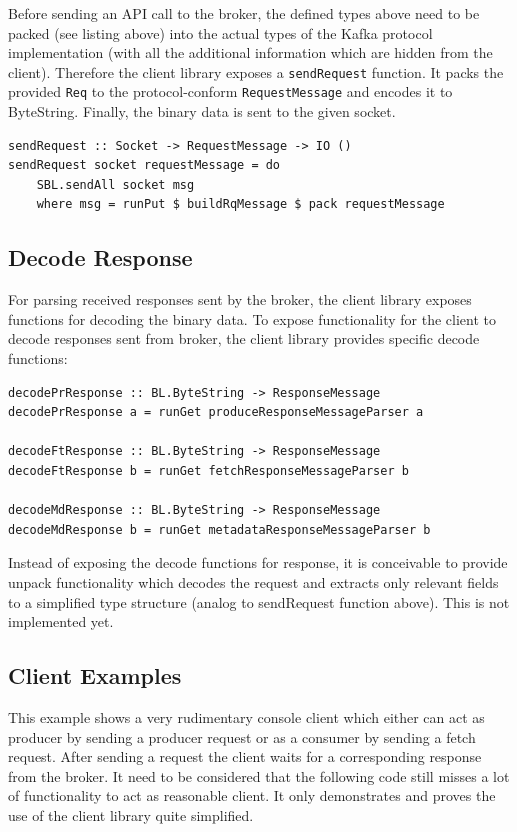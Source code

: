 Before sending an API call to the broker, the defined types above need to be
packed (see listing above) into the actual types of the Kafka protocol
implementation (with all the additional information which are hidden from the
client). Therefore the client library exposes a \lstinline{sendRequest}
function. It packs the provided \lstinline{Req} to the protocol-conform
\lstinline{RequestMessage} and encodes it to ByteString. Finally, the binary
data is sent to the given socket.

\begin{lstlisting}[caption={Pack and send function of client API}]
sendRequest :: Socket -> RequestMessage -> IO ()
sendRequest socket requestMessage = do
    SBL.sendAll socket msg
    where msg = runPut $ buildRqMessage $ pack requestMessage
\end{lstlisting}

\subsection{Decode Response}

For parsing received responses sent by the broker, the client library exposes
functions for decoding the binary data.  To expose functionality for the client
to decode responses sent from broker, the client library provides specific
decode functions: 

\begin{lstlisting}[caption={Exposed decode functions of client API}]
decodePrResponse :: BL.ByteString -> ResponseMessage
decodePrResponse a = runGet produceResponseMessageParser a

decodeFtResponse :: BL.ByteString -> ResponseMessage
decodeFtResponse b = runGet fetchResponseMessageParser b

decodeMdResponse :: BL.ByteString -> ResponseMessage
decodeMdResponse b = runGet metadataResponseMessageParser b
\end{lstlisting}

Instead of exposing the decode functions for response, it is conceivable to
provide unpack functionality which decodes the request and extracts only relevant
fields to a simplified type structure (analog to sendRequest function above).
This is not implemented yet.

\subsection{Client Examples}
This example shows a very rudimentary console client which either can act as producer
by sending a producer request or as a consumer by sending a fetch request. After
sending a request the client waits for a corresponding response from the broker.
It need to be considered that the following code still misses a lot of functionality to
act as reasonable client. It only demonstrates and proves the use of the client library quite
simplified.

